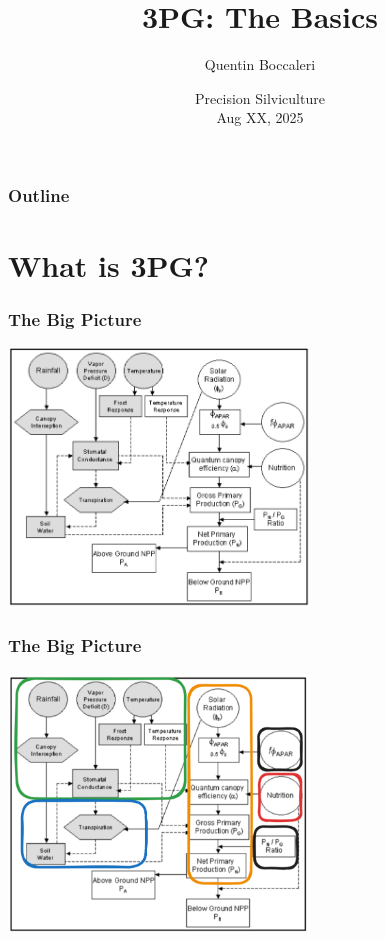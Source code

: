 \documentclass[10pt]{beamer}
\title[3PG: The Basics]{3PG: The Basics}%
\author[Quentin Boccaleri]{Quentin Boccaleri\inst{1}}%
\institute[UGA]{The University of Georgia\inst{1}}
\date[\textcolor{white}{Precision Silviculture, 2025}]
{Precision Silviculture\\
Aug XX, 2025}
\begin{document}
\frame{\titlepage}

\begin{frame}
\frametitle{Outline}
\tableofcontents
\end{frame}

\section{What is 3PG?} 
\begin{frame}
\frametitle{The Big Picture}
\begin{center}
\includegraphics[width=8.0cm]{3PG.png.png}
\end{center}
\end{frame}

\begin{frame}
\frametitle{The Big Picture}
\begin{center}
\includegraphics[width=8.0cm]{3PG2.png}
\end{center}
\end{frame}
\end{document}
